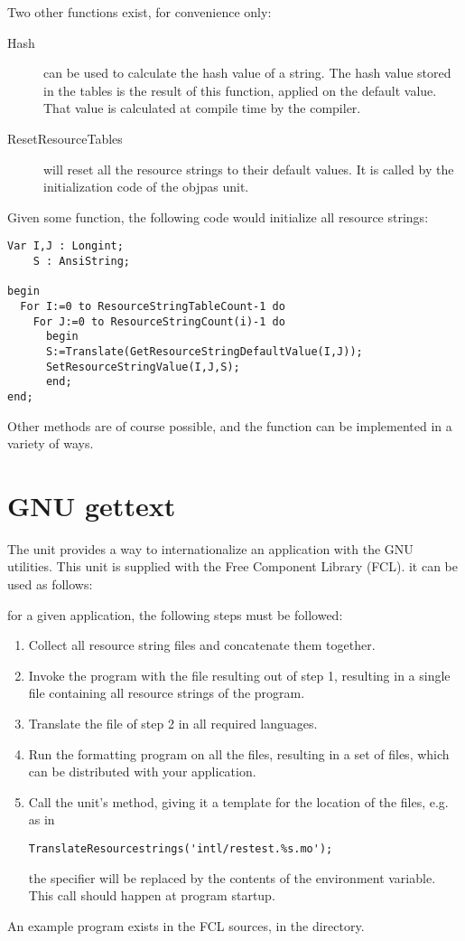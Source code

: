 Two other functions exist, for convenience only:
\begin{description}
\item [Hash] can be used to calculate the hash value of a string. The hash
value stored in the tables is the result of this function, applied on the
default value. That value is calculated at compile time by the compiler.
\item[ResetResourceTables] will reset all the resource strings to their
default values. It is called by the initialization code of the objpas unit.
\end{description}

Given some  function, the following code would initialize
all resource strings:
\begin{verbatim}
Var I,J : Longint;
    S : AnsiString;

begin
  For I:=0 to ResourceStringTableCount-1 do
    For J:=0 to ResourceStringCount(i)-1 do
      begin
      S:=Translate(GetResourceStringDefaultValue(I,J));
      SetResourceStringValue(I,J,S);
      end;
end;
\end{verbatim}
Other methods are of course possible, and the  function
can be implemented in a variety of ways.
\section{GNU gettext}
The unit  provides a way to internationalize an application
with the GNU  utilities. This unit is supplied with  the
Free Component Library (FCL). it can be used as follows:

for a given application, the following steps must be followed:
\begin{enumerate}
\item Collect all resource string files and concatenate them together.
\item Invoke the  program with the file resulting out of step
1, resulting in a single  file containing all resource strings of
the program.
\item Translate the  file of step 2 in all required languages.
\item Run the  formatting program on all the  files,
resulting in a set of  files, which can be distributed with your
application.
\item Call the  unit's  method,
giving it a template for the location of the  files, e.g. as in
\begin{verbatim}
TranslateResourcestrings('intl/restest.%s.mo');
\end{verbatim}
the  specifier will be replaced by the contents of the 
environment variable. This call should happen at program startup.
\end{enumerate}
An example program exists in the FCL sources, in the 
directory.
